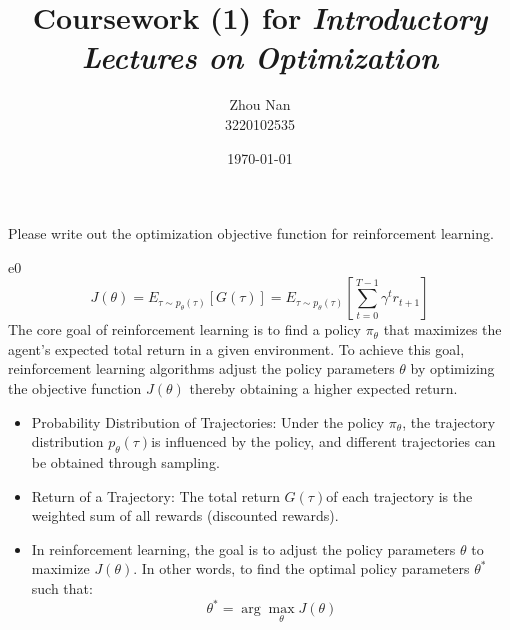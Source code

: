 \documentclass{article}
\title{Coursework (1) for \emph{Introductory Lectures on Optimization}}
\author{Zhou Nan \\ 3220102535}
\date{\today}
\begin{document}
\maketitle

\begin{excercise}\label{e0}
Please write out the optimization objective function for reinforcement learning.
\end{excercise}
\begin{SOLUTION}{e0}
	\[
	J(\theta) = E_{\tau \sim p_{\theta}(\tau)}[G(\tau)] = E_{\tau \sim p_{\theta}(\tau)}[\sum_{t=0}^{T-1} \gamma^t r_{t+1}]
	\]
	The core goal of reinforcement learning is to find a policy $\pi_{\theta}$
  	that maximizes the agent’s expected total return in a given environment. To achieve this goal, reinforcement learning algorithms adjust the policy parameters $\theta$ by optimizing 
  	the objective function \( J(\theta) \) thereby obtaining a higher expected return.
	
	\begin{itemize}
		\item Probability Distribution of Trajectories: Under the policy \( \pi_{\theta} \), the trajectory distribution \( p_{\theta}(\tau) \)is influenced by the policy, and different trajectories can be obtained through sampling.
		\item Return of a Trajectory: The total return \( G(\tau) \)of each trajectory is the weighted sum of all rewards (discounted rewards).
		\item In reinforcement learning, the goal is to adjust the policy parameters \( \theta \) to maximize \( J(\theta) \). In other words, to find the optimal policy parameters \( \theta^* \) such that:
		\[
		\theta^* = \arg\max_{\theta} J(\theta)
		\]
	\end{itemize}
\end{SOLUTION}
\end{document}
